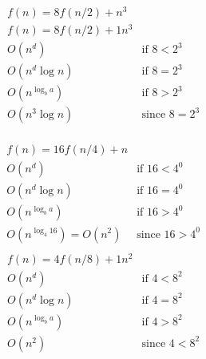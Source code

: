 \documentclass{article}
\begin{document}
\begin{align*}
&f(n) = 8f(n/2) + n^3 & \\
&f(n) = 8f(n/2) + 1n^3 & \\
& O(n^d) & \text{if $8 < 2^3$} \\
& O(n^d\log n) & \text{if $8 = 2^3$} \\
& O(n^{\log_b a}) & \text{if $8 > 2^3$} \\
& O(n^3\log n) & \text{since $8 = 2^3$} \\
\end{align*}

\begin{align*}
& f(n) = 16f(n/4) + n \\
& O(n^d) & \text{if $16 < 4^0$} \\
& O(n^d\log n) & \text{if $16 = 4^0$} \\
& O(n^{\log_b a}) & \text{if $16 > 4^0$} \\
& O(n^{\log_4 16})  = O(n^2) & \text{since $16 > 4^0$} \\
\end{align*}
\begin{align*}
& f(n) = 4f(n/8) + 1n^2 \\
& O(n^d) & \text{if $4 < 8^2$} \\
& O(n^d\log n) & \text{if $4 = 8^2$} \\
& O(n^{\log_b a}) & \text{if $4 > 8^2$} \\
& O(n^2) & \text{since $4 < 8^2$} \\
\end{align*}
\end{document}
